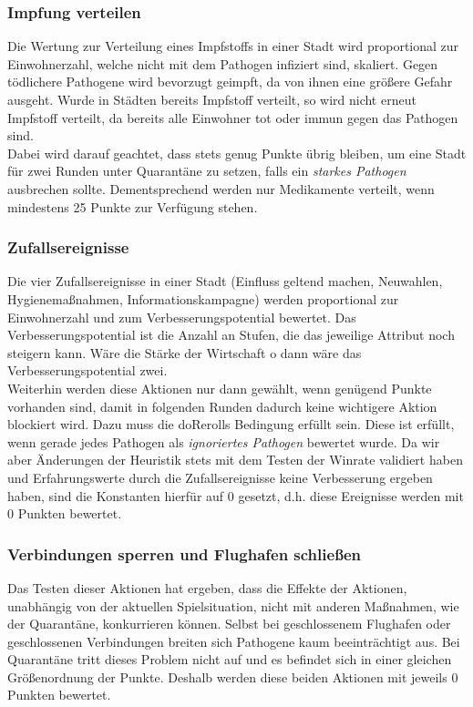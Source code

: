 \documentclass{article}
\newcommand{\gquote}[1]{\glqq #1\grqq} %
\let\oldgls\gls
\renewcommand{\gls}[1]{\emph{\oldgls{#1}}} %
\begin{document}
\subsubsection{Impfung verteilen}
Die Wertung zur Verteilung eines Impfstoffs in einer Stadt wird proportional zur Einwohnerzahl, welche nicht mit dem Pathogen infiziert sind, skaliert. Gegen tödlichere Pathogene wird bevorzugt geimpft, da von ihnen eine größere Gefahr ausgeht. Wurde in Städten bereits Impfstoff verteilt, so wird nicht erneut Impfstoff verteilt, da bereits alle Einwohner tot oder immun gegen das Pathogen sind. \\
Dabei wird darauf geachtet, dass stets genug Punkte übrig bleiben, um eine Stadt für zwei Runden unter Quarantäne zu setzen, falls ein \gls{starkes Pathogen} ausbrechen sollte. Dementsprechend werden nur Medikamente verteilt, wenn mindestens 25 Punkte zur Verfügung stehen.
\subsubsection{Zufallsereignisse}
Die vier Zufallsereignisse in einer Stadt (Einfluss geltend machen, Neuwahlen, Hygienemaßnahmen, Informationskampagne) werden proportional zur Einwohnerzahl und zum Verbesserungspotential bewertet. Das Verbesserungspotential ist die Anzahl an Stufen, die das jeweilige Attribut noch steigern kann. Wäre die Stärke der Wirtschaft \gquote{o} dann wäre das Verbesserungspotential zwei.\\
Weiterhin werden diese Aktionen nur dann gewählt, wenn genügend Punkte vorhanden sind, damit in folgenden Runden dadurch keine wichtigere Aktion blockiert wird. Dazu muss die \gquote{doRerolls} Bedingung erfüllt sein. Diese ist erfüllt, wenn gerade jedes Pathogen als \gls{ignoriertes Pathogen} bewertet wurde. Da wir aber Änderungen der Heuristik stets mit dem Testen der Winrate validiert haben und Erfahrungswerte durch die Zufallsereignisse keine Verbesserung ergeben haben, sind die Konstanten hierfür auf 0 gesetzt, d.h. diese Ereignisse werden mit 0 Punkten bewertet.
\subsubsection{Verbindungen sperren und Flughafen schließen}
Das Testen dieser Aktionen hat ergeben, dass die Effekte der Aktionen, unabhängig von der aktuellen Spielsituation, nicht mit anderen Maßnahmen, wie der Quarantäne, konkurrieren können. Selbst bei geschlossenem Flughafen oder geschlossenen Verbindungen breiten sich Pathogene kaum beeinträchtigt aus. Bei Quarantäne tritt dieses Problem nicht auf und es befindet sich in einer gleichen Größenordnung der Punkte. Deshalb werden diese beiden Aktionen mit jeweils 0 Punkten bewertet. 
\newpage
\end{document}
